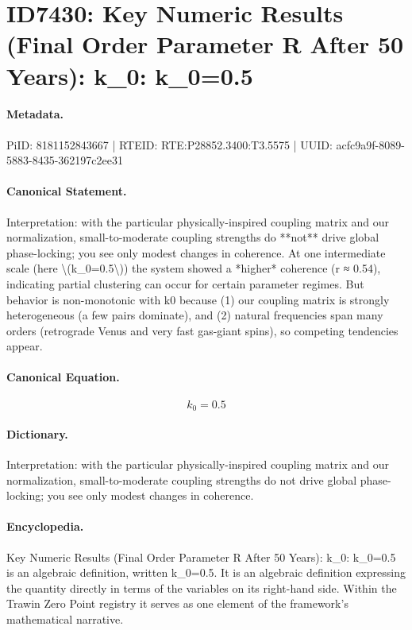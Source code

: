 \section*{ID7430: Key Numeric Results (Final Order Parameter R After 50 Years): k\_0: k\_0=0.5}
\paragraph{Metadata.}
PiID: 8181152843667 | RTEID: RTE:P28852.3400:T3.5575 | UUID: acfc9a9f-8089-5883-8435-362197c2ee31

\paragraph{Canonical Statement.}
Interpretation: with the particular physically-inspired coupling matrix and our normalization, small-to-moderate coupling strengths do **not** drive global phase-locking; you see only modest changes in coherence. At one intermediate scale (here \textbackslash{}(k\_0=0.5\textbackslash{})) the system showed a *higher* coherence (r ≈ 0.54), indicating partial clustering can occur for certain parameter regimes. But behavior is non-monotonic with k0 because (1) our coupling matrix is strongly heterogeneous (a few pairs dominate), and (2) natural frequencies span many orders (retrograde Venus and very fast gas-giant spins), so competing tendencies appear.

\paragraph{Canonical Equation.}
\[
k_0=0.5
\]

\paragraph{Dictionary.}
Interpretation: with the particular physically-inspired coupling matrix and our normalization, small-to-moderate coupling strengths do not drive global phase-locking; you see only modest changes in coherence.

\paragraph{Encyclopedia.}
Key Numeric Results (Final Order Parameter R After 50 Years): k\_0: k\_0=0.5 is an algebraic definition, written k\_0=0.5. It is an algebraic definition expressing the quantity directly in terms of the variables on its right-hand side. Within the Trawin Zero Point registry it serves as one element of the framework's mathematical narrative.
